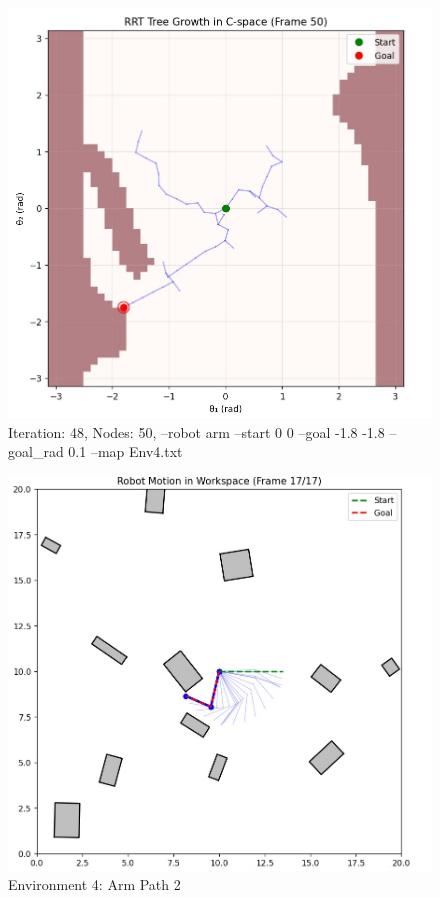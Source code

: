 \documentclass{article}
\begin{document}
\begin{figure} [H]
    \centering
    \includegraphics[width=0.5\linewidth]{latex_media/Env4TreeGrowthA2.jpg}
    \caption{Iteration: 48, Nodes: 50, --robot arm --start 0 0 --goal -1.8 -1.8 --goal\_rad 0.1 --map Env4.txt }
\end{figure}

\begin{figure} [H]
    \centering
    \includegraphics[width=0.5\linewidth]{latex_media/Env4RobotPathA2.jpg}
    \caption{Environment 4: Arm Path 2}
\end{figure}
\end{document}
